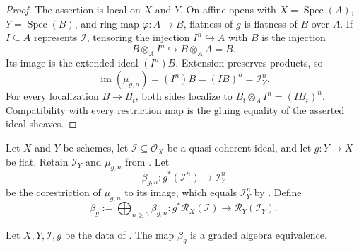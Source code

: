 \begin{proof}
  The assertion is local on $X$ and $Y$.  On affine opens with
  $X=\operatorname{Spec}(A)$, $Y=\operatorname{Spec}(B)$, and ring map
  $\varphi\colon A\to B$, flatness of $g$ is flatness of $B$ over $A$.
  If $I\subseteq A$ represents $\mathcal I$, tensoring the injection
  $I^n\hookrightarrow A$ with $B$ is the injection
  \[
    B\otimes_AI^n\hookrightarrow B\otimes_AA=B.
  \]
  Its image is the extended ideal $(I^n)B$.  Extension preserves products, so
  \[
    \operatorname{im}(\mu_{g,n})
      =(I^n)B=(IB)^n=\mathcal I_Y^n.
  \]
  For every localization $B\to B_t$, both sides localize to
  $B_t\otimes_AI^n=(IB_t)^n$.  Compatibility with every restriction map is
  the gluing equality of the asserted ideal sheaves.
\end{proof}

\begin{definition}
  \label{def:nagata-flat-pullback-rees-map}

  Let $X$ and $Y$ be schemes, let
  $\mathcal I\subseteq\mathcal O_X$ be a quasi-coherent ideal, and let
  $g\colon Y\to X$ be flat.  Retain $\mathcal I_Y$ and $\mu_{g,n}$ from
  .  Let
  \[
    \beta_{g,n}\colon g^*(\mathcal I^n)\longrightarrow\mathcal I_Y^n
  \]
  be the corestriction of $\mu_{g,n}$ to its image, which equals
  $\mathcal I_Y^n$ by
  .  Define
  \[
    \beta_g:=\bigoplus_{n\ge0}\beta_{g,n}\colon
      g^*\mathcal R_X(\mathcal I)\longrightarrow
      \mathcal R_Y(\mathcal I_Y).
  \]
\end{definition}

\begin{lemma}
  \label{lemma:nagata-flat-pullback-rees}

  Let $X,Y,\mathcal I,g$ be the data of
  .  The map $\beta_g$ is a graded
  algebra equivalence.
\end{lemma}

